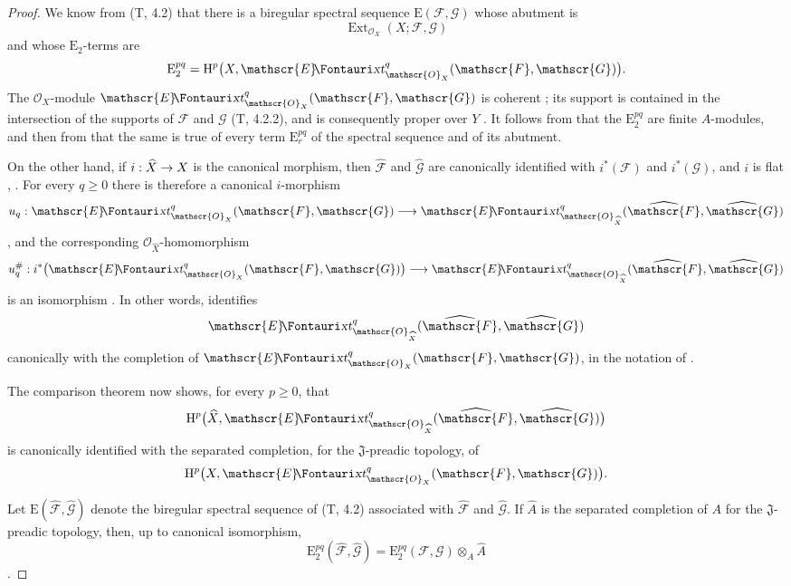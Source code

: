 \documentclass[oneside]{amsart}
\theoremstyle{ega-env-style}
\theoremstyle{ega-thm-env-style}
\theoremstyle{ega-defn-env-style}
\def\mathcal{\mathscr}
\def\sh{\mathcal}                   %
\def\geq{\geqslant}                 %
\def\HH{\mathrm{H}}                 %
\def\Ext{\operatorname{Ext}}
\renewcommand{\to}{\mathchoice{\longrightarrow}{\rightarrow}{\rightarrow}{\rightarrow}}
\renewcommand{\hat}[1]{\widehat{#1}}
\def\shExt{\sh{E}\textup{\kern-2.2pt{\Fontauri\slshape xt}}}   %
\newcommand{\oldpage}[2][]{{\marginnote{\normalfont{\textbf{#1}~|~#2}}}\ignorespaces}
\begin{document}
\begin{proof}
We know from (T, 4.2) that there is a biregular spectral sequence
$\mathrm{E}(\sh{F},\sh{G})$ whose abutment is
\[
  \Ext_{\sh{O}_X}(X;\sh{F},\sh{G})
\]
and whose $\mathrm{E}_2$-terms are
\[
  \mathrm{E}_2^{pq}
  =\HH^p\bigl(X,\shExt^q_{\sh{O}_X}(\sh{F},\sh{G})\bigr).
\]
The $\sh{O}_X$-module
$\shExt^q_{\sh{O}_X}(\sh{F},\sh{G})$ is coherent
; its support is contained in the intersection of
the supports of $\sh{F}$ and $\sh{G}$ (T, 4.2.2), and is consequently
proper over $Y$ .  It follows from
 that the $\mathrm{E}_2^{pq}$ are finite
$A$-modules, and then from  that the same is true
of every term $\mathrm{E}_r^{pq}$ of the spectral sequence and of
its abutment.

On the other hand, if $i:\hat{X}\to X$ is the canonical morphism,
then $\hat{\sh{F}}$ and $\hat{\sh{G}}$ are canonically identified
with $i^*(\sh{F})$ and $i^*(\sh{G})$, and $i$ is flat
, .  For every $q\geq0$ there
is therefore a canonical $i$-morphism
\[
  u_q:\shExt^q_{\sh{O}_X}(\sh{F},\sh{G})
  \longrightarrow
  \shExt^q_{\sh{O}_{\hat{X}}}
    (\hat{\sh{F}},\hat{\sh{G}})
\]
, and the corresponding
$\sh{O}_{\hat{X}}$-homomorphism
\[
  u_q^\#:
  i^*\bigl(\shExt^q_{\sh{O}_X}(\sh{F},\sh{G})\bigr)
  \longrightarrow
  \shExt^q_{\sh{O}_{\hat{X}}}
    (\hat{\sh{F}},\hat{\sh{G}})
\]
is an isomorphism .  In other words,
 identifies
\[
  \shExt^q_{\sh{O}_{\hat{X}}}
    (\hat{\sh{F}},\hat{\sh{G}})
\]
canonically with the completion of
$\shExt^q_{\sh{O}_X}(\sh{F},\sh{G})$, in the notation of
.

The comparison theorem  now shows, for every
$p\geq0$, that
\[
  \HH^p\bigl(\hat{X},
    \shExt^q_{\sh{O}_{\hat{X}}}
      (\hat{\sh{F}},\hat{\sh{G}})\bigr)
\]
is canonically identified with the separated completion, for the
$\mathfrak J$-preadic topology, of
\[
  \HH^p\bigl(X,\shExt^q_{\sh{O}_X}(\sh{F},\sh{G})\bigr).
\]

\oldpage[III]{139}

Let $\mathrm{E}(\hat{\sh{F}},\hat{\sh{G}})$ denote the biregular
spectral sequence of (T, 4.2) associated with $\hat{\sh{F}}$ and
$\hat{\sh{G}}$.  If $\hat{A}$ is the separated completion of $A$ for
the $\mathfrak J$-preadic topology, then, up to canonical
isomorphism,
\[
  \mathrm{E}_2^{pq}(\hat{\sh{F}},\hat{\sh{G}})
  =
  \mathrm{E}_2^{pq}(\sh{F},\sh{G})\otimes_A\hat{A}
\]
.


\end{proof}
\end{document}
